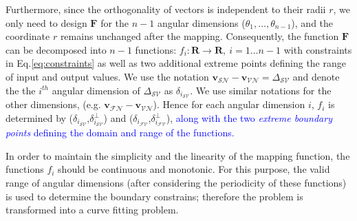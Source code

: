 Furthermore, since the orthogonality of vectors is independent to their radii $r$, we only need to design $\mathbf{F}$ for the $n-1$ angular dimensions ($\theta_1,\dots,\theta_{n-1}$), and the coordinate $r$ remains unchanged after the mapping. Consequently, the function $\mathbf{F}$ can be decomposed into $n-1$ functions: $f_i: \mathbf{R}\to \mathbf{R},~i=1\dots n-1$ with constraints in Eq.\ref{eq:constraints} as well as two additional extreme points defining the range of input and output values. %
We use the notation $\mathbf{v}_{\mathcal{SN}} - \mathbf{v}_{\mathcal{VN}} = \Delta_{\mathcal{SV}}$ and denote the the $i^{th}$ angular dimension of $\Delta_{\mathcal{SV}}$ as $\delta_{i_{{\mathcal{SV}}}}$. We use similar notations for the other dimensions, (e.g. $\mathbf{v}_{\mathcal{FN}} - \mathbf{v}_{\mathcal{VN}}$). %
Hence for each angular dimension $i$, $f_i$ is determined by ($\delta_{i_{{\mathcal{SV}}}}$,$\delta^{\perp}_{i_{{\mathcal{SV}}}}$) and ($\delta_{i_{{\mathcal{FV}}}}$,$\delta^{\perp}_{i_{{\mathcal{FV}}}}$), \textcolor{blue}{along with the two \textit{extreme boundary points} defining the domain and range of the functions.}




In order to maintain the simplicity and the linearity of the mapping function, the functions $f_i$ should be continuous and monotonic. For this purpose, the %
valid range of angular dimensions (after considering the periodicity of these functions) is used to determine the boundary constrains; therefore the problem is transformed into a curve fitting problem. 

